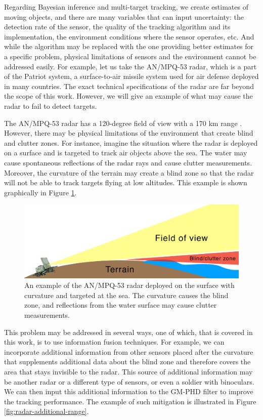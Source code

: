 Regarding Bayesian inference and multi-target tracking, we create estimates of moving objects, and there are many variables that can input uncertainty: the detection rate of the sensor, the quality of the tracking algorithm and its implementation, the environment conditions where the sensor operates, etc. And while the algorithm may be replaced with the one providing better estimates for a specific problem, physical limitations of sensors and the environment cannot be addressed easily. For example, let us take the AN/MPQ-53 radar, which is a part of the Patriot system, a surface-to-air missile system used for air defense deployed in many countries. The exact technical specifications of the radar are far beyond the scope of this work. However, we will give an example of what may cause the radar to fail to detect targets.

The AN/MPQ-53 radar has a 120-degree field of view with a 170 km range \cite{wolffMPQ53Radartutorial}. However, there may be physical limitations of the environment that create blind and clutter zones. For instance, imagine the situation where the radar is deployed on a surface and is targeted to track air objects above the sea. The water may cause spontaneous reflections of the radar rays and cause clutter measurements. Moreover, the curvature of the terrain may create a blind zone so that the radar will not be able to track targets flying at low altitudes. This example is shown graphically in Figure \ref{fig:radar-blind}.

\begin{figure}[ht]
    \centering
    \includegraphics[width=.95\linewidth]{figures/radar-blind.png}
    \caption[Example of a radar blind zone caused by the curvature of the terrain and reflections from water surface.]{An example of the AN/MPQ-53 radar deployed on the surface with curvature and targeted at the sea. The curvature causes the blind zone, and reflections from the water surface may cause clutter measurements.}
    \label{fig:radar-blind}
\end{figure}

This problem may be addressed in several ways, one of which, that is covered in this work, is to use information fusion techniques. For example, we can incorporate additional information from other sensors placed after the curvature that supplements additional data about the blind zone and therefore covers the area that stays invisible to the radar. This source of additional information may be another radar or a different type of sensors, or even a soldier with binoculars. We can then input this additional information to the GM-PHD filter to improve the tracking performance. The example of such mitigation is illustrated in Figure \ref{fig:radar-additional-range}.

